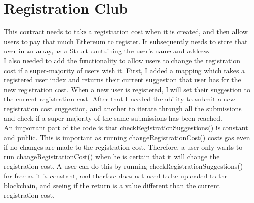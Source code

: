\section{Registration Club}
This contract needs to take a registration cost when it is created, and then allow users to pay that much Ethereum to register. It subsequently needs to store that user in an array, as a Struct containing the user's name and address \\
I also needed to add the functionality to allow users to change the registration cost if a super-majority of users wish it.  First, I added a mapping which takes a registered user index and returns their current suggestion that user has for the new registration cost. When a new user is registered, I will set their suggestion to the current registration cost. After that I needed the ability to submit a new registration cost suggestion, and another to iterate through all the submissions and check if a super majority of the same submissions has been reached. \\
An important part of the code is that checkRegistrationSuggestions() is constant and public. This is important as running changeRegistrationCost() costs gas even if no changes are made to the registration cost. Therefore, a user only wants to run changeRegistrationCost() when he is certain that it will change the registration cost. A user can do this by running checkRegistrationSuggestions() for free as it is constant, and therfore does not need to be uploaded to the blockchain, and seeing if the return is a value different than the current registration cost.
